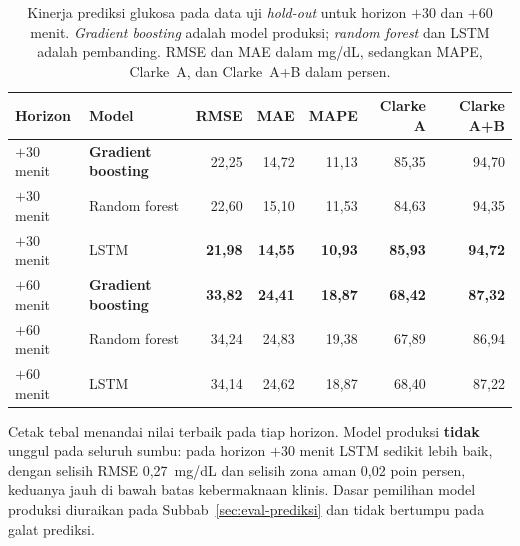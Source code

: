 %
\begin{table}[htbp]
\centering
\caption{Kinerja prediksi glukosa pada data uji \emph{hold-out} untuk horizon $+30$ dan $+60$ menit. \emph{Gradient boosting} adalah model produksi; \emph{random forest} dan LSTM adalah pembanding. RMSE dan MAE dalam mg/dL, sedangkan MAPE, Clarke~A, dan Clarke~A+B dalam persen.}
\label{tab:kinerja-prediksi}
\small
\begin{tabularx}{\textwidth}{@{}lLrrrrr@{}}
\toprule
\textbf{Horizon} & \textbf{Model} & \textbf{RMSE} & \textbf{MAE} & \textbf{MAPE} & \textbf{Clarke A} & \textbf{Clarke A+B} \\
\midrule
$+30$ menit & \textbf{Gradient boosting} & 22,25 & 14,72 & 11,13 & 85,35 & 94,70 \\
$+30$ menit & Random forest & 22,60 & 15,10 & 11,53 & 84,63 & 94,35 \\
$+30$ menit & LSTM & \textbf{21,98} & \textbf{14,55} & \textbf{10,93} & \textbf{85,93} & \textbf{94,72} \\
\midrule
$+60$ menit & \textbf{Gradient boosting} & \textbf{33,82} & \textbf{24,41} & \textbf{18,87} & \textbf{68,42} & \textbf{87,32} \\
$+60$ menit & Random forest & 34,24 & 24,83 & 19,38 & 67,89 & 86,94 \\
$+60$ menit & LSTM & 34,14 & 24,62 & 18,87 & 68,40 & 87,22 \\
\bottomrule
\end{tabularx}

\vspace{0.4em}
{\tabnotestyle Cetak tebal menandai nilai terbaik pada tiap horizon. Model produksi \textbf{tidak} unggul pada seluruh sumbu: pada horizon $+30$ menit LSTM sedikit lebih baik, dengan selisih RMSE 0,27~mg/dL dan selisih zona aman 0,02 poin persen, keduanya jauh di bawah batas kebermaknaan klinis. Dasar pemilihan model produksi diuraikan pada Subbab~\ref{sec:eval-prediksi} dan tidak bertumpu pada galat prediksi.\par}
\end{table}
